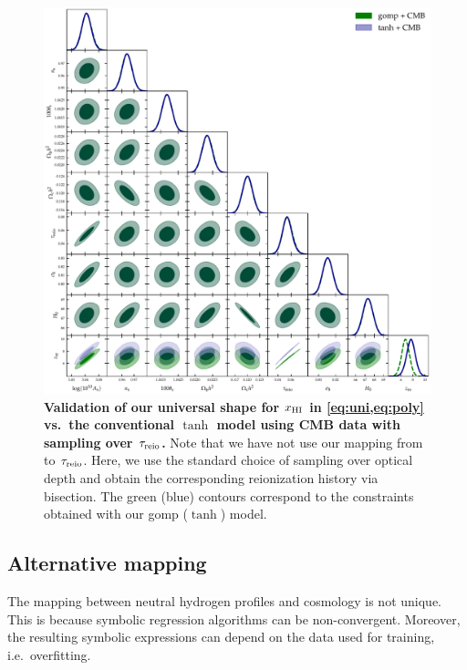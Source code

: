 \begin{figure}[t]
\centering
\includegraphics[width=\linewidth]{figs/gomp_tanh_triangle_tau.pdf}
\caption{\textbf{Validation of our universal shape for $x_{\mathrm{HI}}$ in
\cref{eq:uni,eq:poly} vs.\ the conventional $\tanh$ model using CMB data
with sampling over $\tau_{\mathrm{reio}}$.}
Note that we have not use our mapping from  to
$\tau_{\mathrm{reio}}$.
Here, we use the standard choice of sampling over optical depth and
obtain the corresponding reionization history via bisection.
The green (blue) contours correspond to the constraints obtained with
our gomp ($\tanh$) model.}
\label{fig:tg}
\end{figure}


\subsection*{Alternative mapping}
\label{ssec:SRHalf}

The mapping between neutral hydrogen profiles and cosmology is not
unique.
This is because symbolic regression algorithms can be non-convergent.
Moreover, the resulting symbolic expressions can depend on the data used
for training, i.e.\ overfitting.

